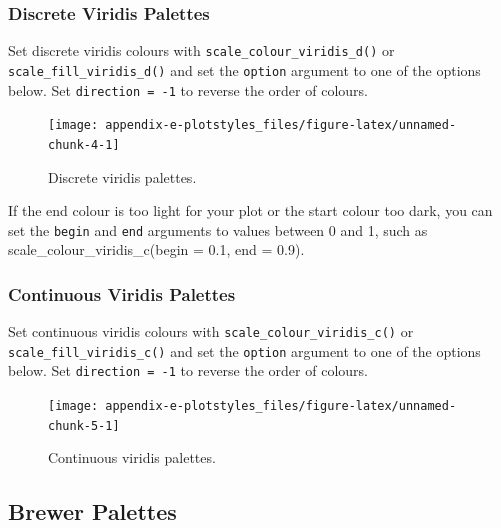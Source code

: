 \documentclass[
  oneside]{book}
\begin{document}
\hypertarget{discrete-viridis-palettes}{%
\subsubsection{Discrete Viridis Palettes}\label{discrete-viridis-palettes}}

Set discrete viridis colours with \texttt{scale\_colour\_viridis\_d()} or \texttt{scale\_fill\_viridis\_d()} and set the \texttt{option} argument to one of the options below. Set \texttt{direction\ =\ -1} to reverse the order of colours.

\begin{figure}

{\centering \texttt{[image: appendix-e-plotstyles\_files/figure-latex/unnamed-chunk-4-1]} 

}

\caption{Discrete viridis palettes.}\label{fig:unnamed-chunk-4}
\end{figure}

\begin{info}
If the end colour is too light for your plot or the start colour too dark, you can set the \texttt{begin} and \texttt{end} arguments to values between 0 and 1, such as {scale\_colour\_viridis\_c}{(}begin {=} {0.1}, end {=} {0.9}{)}.

\end{info}

\hypertarget{continuous-viridis-palettes}{%
\subsubsection{Continuous Viridis Palettes}\label{continuous-viridis-palettes}}

Set continuous viridis colours with \texttt{scale\_colour\_viridis\_c()} or \texttt{scale\_fill\_viridis\_c()} and set the \texttt{option} argument to one of the options below. Set \texttt{direction\ =\ -1} to reverse the order of colours.

\begin{figure}

{\centering \texttt{[image: appendix-e-plotstyles\_files/figure-latex/unnamed-chunk-5-1]} 

}

\caption{Continuous viridis palettes.}\label{fig:unnamed-chunk-5}
\end{figure}

\hypertarget{brewer-palettes}{%
\subsection{Brewer Palettes}\label{brewer-palettes}}
\end{document}
